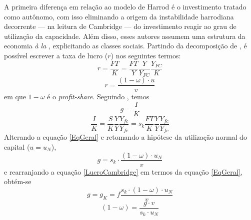 A primeira diferença em relação ao modelo de Harrod é o investimento tratado como autônomo, com isso eliminando a origem da instabilidade harrodiana decorrente --- na leitura de Cambridge --- do investimento reagir ao grau de utilização da capacidade.
Além disso, esses autores assumem uma estrutura da economia \textit{à la} \textcite{kalecki_theory_1954}, explicitando as classes sociais. Partindo da decomposição de \textcite{weisskopf_marxian_1979}, é possível escrever a taxa de lucro ($r$) nos seguintes termos:
$$
r = \frac{FT}{K} = \frac{FT}{Y}\frac{Y}{Y_{FC}}\frac{Y_{FC}}{K}
$$ 
\begin{equation}
\label{LucroCambridge}
r = \frac{(1-\omega)\cdot u}{v}
\end{equation}
em que $1-\omega$ é o \textit{profit-share}. Seguindo \textcite{serrano_trouble_2017}, temos
$$
g = \frac{I}{K} 
$$
$$
\frac{I}{K} = \frac{S}{K}\frac{Y}{Y}\frac{Y_{fc}}{Y_{fc}} = s_k\frac{FT}{K}\frac{Y}{Y}\frac{Y_{fc}}{Y_{fc}}
$$
Alterando a equação \ref{EqGeral} e retomando a hipótese da utilização normal do capital ($u=u_N$), 
\begin{equation}
g = s_k\cdot \frac{(1-\omega)\cdot u_N}{v}
\end{equation}
e rearranjando a equação \ref{LucroCambridge} em termos da equação \ref{EqGeral}, obtém-se
$$
g = g_K = f\frac{s_k\cdot (1-\omega) \cdot u_N}{v}
$$
\begin{equation}
\label{Fechamento_Cambridge}
(1-\omega) = \frac{g\cdot v}{s_k\cdot u_N}
\end{equation}

